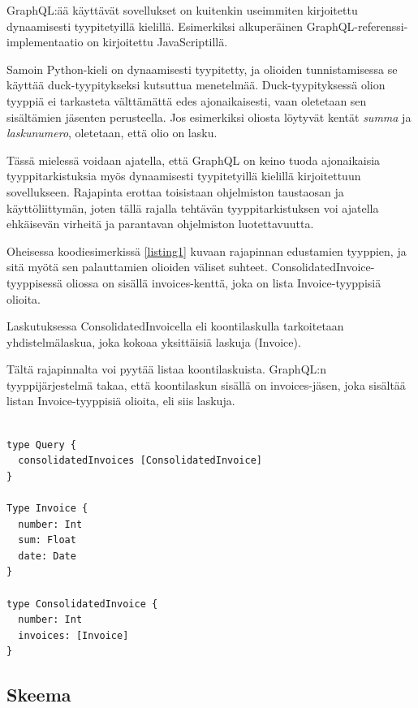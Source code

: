GraphQL:ää käyttävät sovellukset on kuitenkin useimmiten kirjoitettu
dynaamisesti tyypitetyillä kielillä. Esimerkiksi alkuperäinen
GraphQL-referenssi-implementaatio on kirjoitettu
JavaScriptillä.\cite{graphqlRefImple2021Oct}

Samoin Python-kieli on dynaamisesti tyypitetty, ja olioiden
tunnistamisessa se käyttää duck-tyypitykseksi kutsuttua menetelmää.
Duck-tyypityksessä olion tyyppiä ei tarkasteta välttämättä edes
ajonaikaisesti, vaan oletetaan sen sisältämien jäsenten
perusteella.\cite{pythonGloss2021Oct} Jos esimerkiksi oliosta löytyvät
kentät \emph{summa} ja \emph{laskunumero}, oletetaan, että olio on
lasku.

Tässä mielessä voidaan ajatella, että GraphQL on keino tuoda
ajonaikaisia tyyppitarkistuksia myös dynaamisesti tyypitetyillä kielillä
kirjoitettuun sovellukseen. Rajapinta erottaa toisistaan ohjelmiston
taustaosan ja käyttöliittymän, joten tällä rajalla tehtävän
tyyppitarkistuksen voi ajatella ehkäisevän virheitä ja parantavan
ohjelmiston luotettavuutta.

Oheisessa koodiesimerkissä \ref{listing1} kuvaan rajapinnan edustamien
tyyppien, ja sitä myötä sen palauttamien olioiden väliset suhteet.
ConsolidatedInvoice-tyyppisessä oliossa on sisällä invoices-kenttä, joka
on lista Invoice-tyyppisiä olioita.

Laskutuksessa ConsolidatedInvoicella eli koontilaskulla tarkoitetaan
yhdistelmälaskua, joka kokoaa yksittäisiä laskuja (Invoice).

Tältä rajapinnalta voi pyytää listaa koontilaskuista. GraphQL:n
tyyppijärjestelmä takaa, että koontilaskun sisällä on invoices-jäsen,
joka sisältää listan Invoice-tyyppisiä olioita, eli siis laskuja.

\begin{code}
  \begin{verbatim}

type Query {
  consolidatedInvoices [ConsolidatedInvoice]
}

Type Invoice {
  number: Int
  sum: Float
  date: Date
}

type ConsolidatedInvoice {
  number: Int
  invoices: [Invoice]
}
  \end{verbatim}
  \label{listing1}
\end{code}

\hypertarget{skeema}{%
\subsection{Skeema}\label{skeema}}

